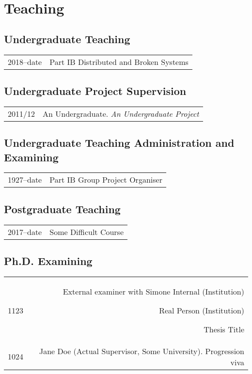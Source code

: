 


\section{Teaching}

\subsection{Undergraduate Teaching}
\begin{longtabu} to 
  2018--date & Part IB Distributed and Broken Systems\\
\end{longtabu}

\subsection{Undergraduate Project Supervision}
\begin{longtabu} to 
  2011/12
  & An Undergraduate. \it An Undergraduate Project\\
\end{longtabu}

\subsection{Undergraduate Teaching Administration and Examining}
\begin{longtabu} to 
  1927--date & Part IB Group Project Organiser\\
\end{longtabu}

\subsection{Postgraduate Teaching}
\begin{longtabu} to 
  2017--date & Some Difficult Course\\
\end{longtabu}

\subsection{Ph.D. Examining}
\begin{longtabu} to 
  1123 & External examiner with Simone Internal (Institution)
  \par Real Person (Institution)
  \par Thesis Title\\
  1024 & Jane Doe (Actual Supervisor, Some University). Progression viva\\
\end{longtabu}

